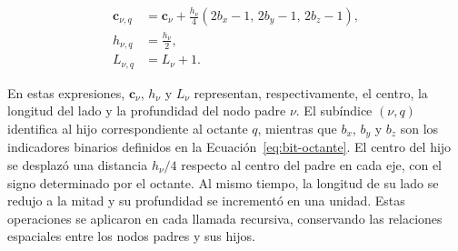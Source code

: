 \begin{subequations}\label{eq:hijo}
\begin{align}
\mathbf c_{\nu,q}
&=
\mathbf c_\nu
+
\frac{h_\nu}{4}
\left(
2b_x-1,\,
2b_y-1,\,
2b_z-1
\right),
\label{eq:centro-hijo}\\
h_{\nu,q}
&=
\frac{h_\nu}{2},
\label{eq:lado-hijo}\\
L_{\nu,q}
&=
L_\nu+1.
\label{eq:profundidad-hijo}
\end{align}
\end{subequations}

En estas expresiones, $\mathbf c_\nu$, $h_\nu$ y $L_\nu$
representan, respectivamente, el centro, la longitud del lado y la
profundidad del nodo padre $\nu$. El subíndice $(\nu,q)$ identifica
al hijo correspondiente al octante $q$, mientras que
$b_x$, $b_y$ y $b_z$ son los indicadores binarios definidos en la
Ecuación~\eqref{eq:bit-octante}. El centro del hijo se desplazó una
distancia $h_\nu/4$ respecto al centro del padre en cada eje, con el
signo determinado por el octante. Al mismo tiempo, la longitud de su
lado se redujo a la mitad y su profundidad se incrementó en una
unidad. Estas operaciones se aplicaron en cada llamada recursiva,
conservando las relaciones espaciales entre los nodos padres y sus
hijos.

